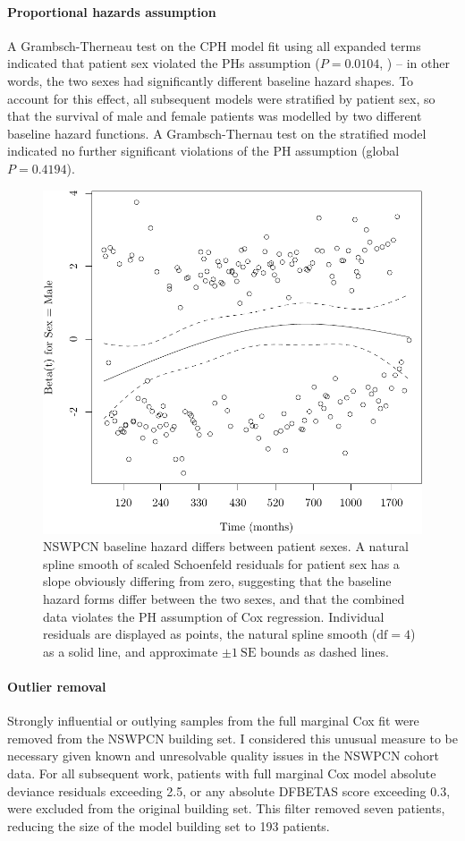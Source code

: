 \documentclass[dissertation.tex]{subfiles}
\begin{document}
\paragraph{Proportional hazards assumption}
A Grambsch-Therneau test \cite{Grambsch1994} on the \gls{CPH} model fit using all expanded terms indicated that patient sex violated the \glspl{PH} assumption ($P = 0.0104$, ) -- in other words, the two sexes had significantly different baseline hazard shapes.  To account for this effect, all subsequent models were stratified by patient sex, so that the survival of male and female patients was modelled by two different baseline hazard functions.  A Grambsch-Thernau test on the stratified model indicated no further significant violations of the \gls{PH} assumption (global $P = 0.4194$).

\begin{figure}
\centering
  \includegraphics[width=.7\linewidth]{analysis/nomogram/figure/05-eda-ph-check-full-1}
  \caption[Baseline hazard forms differ between patient sexes]{NSWPCN baseline hazard differs between patient sexes.  A natural spline smooth of scaled Schoenfeld residuals for patient sex has a slope obviously differing from zero, suggesting that the baseline hazard forms differ between the two sexes, and that the combined data violates the \acrshort{PH} assumption of Cox regression.  Individual residuals are displayed as points, the natural spline smooth ($\mbox{df}=4$) as a solid line, and approximate $\pm 1\ \mbox{SE}$ bounds as dashed lines.}
\label{fig:nomo-ph-plot-sex}
\end{figure}

\paragraph{Outlier removal}
Strongly influential or outlying samples from the full marginal Cox fit were removed from the \gls{NSWPCN} building set.  I considered this unusual measure to be necessary given known and unresolvable quality issues in the \gls{NSWPCN} cohort data.  For all subsequent work, patients with full marginal Cox model absolute deviance residuals exceeding 2.5, or any absolute DFBETAS score exceeding 0.3, were excluded from the original building set.  This filter removed seven patients, reducing the size of the model building set to 193 patients.	
\end{document}
